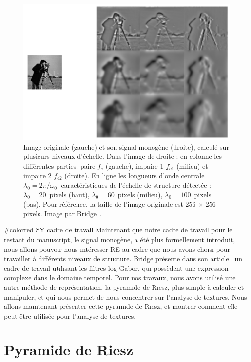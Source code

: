 \begin{figure}
    \centering
    \includegraphics[width=.75\textwidth]{resources/images/cameraman_monogenic}
    \caption[Signal monogène calculé pour plusieurs niveaux d'échelle]{Image originale (gauche) et son signal monogène (droite), calculé sur plusieurs niveaux d'échelle. Dans l'image de droite : en colonne les différentes parties, paire $f_e$ (gauche), impaire 1 $f_{o1}$ (milieu) et impaire 2 $f_{o2}$ (droite). En ligne les longueurs d'onde centrale $\lambda_0 = 2\pi/\omega_0$, caractéristiques de l'échelle de structure détectée : $\lambda_0 = 20$~pixels (haut), $\lambda_0 = 60$~pixels (milieu), $\lambda_0 = 100$~pixels (bas). Pour référence, la taille de l'image originale est 256 $\times$ 256 pixels. Image par Bridge~\cite{bridge_introduction_2018}.}
    \label{fig:cameraman-monogenic}
\end{figure}



\bigskip
{#color{red} SY cadre de travail}
Maintenant que notre cadre de travail pour le restant du manuscript, le signal monogène, a été plus formellement introduit, nous allons pouvoir nous intéresser RE au cadre que nous avons choisi pour travailler à différents niveaux de structure. Bridge présente dans son article~\cite{bridge_introduction_2018} un cadre de travail utilisant les filtres log-Gabor, qui possèdent une expression complexe dans le domaine temporel. Pour nos travaux, nous avons utilisé une autre méthode de représentation, la pyramide de Riesz, plus simple à calculer et manipuler, et qui nous permet de nous concentrer sur l'analyse de textures. Nous allons maintenant présenter cette pyramide de Riesz, et montrer comment elle peut être utilisée pour l'analyse de textures.

\section{Pyramide de Riesz}

